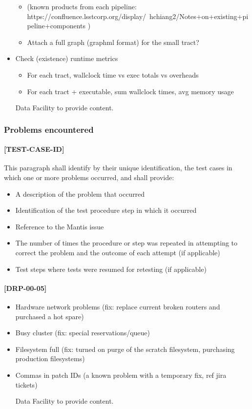 \documentclass[DM,lsstdraft,STR,toc]{lsstdoc}
\begin{document}
\begin{itemize}
\begin{itemize}
    \item (known products from each pipeline: https://confluence.lsstcorp.org/display/~hchiang2/Notes+on+existing+pipeline+components )
    \item Attach a full graph (graphml format) for the small tract?
  \end{itemize}
  \item Check (existence) runtime metrics
  \begin{itemize}
    \item For each tract, wallclock time vs exec totals vs overheads
    \item For each tract + executable, sum wallclock times, avg memory usage
  \end{itemize}
\begin{note}
Data Facility to provide content.
\end{note}
\end{itemize}

\subsubsection{Problems encountered}
\paragraph{[TEST-CASE-ID]}
This paragraph shall identify by their unique identification, the test cases in which one or more problems occurred, and shall provide:
\begin{itemize}
\item A description of the problem that occurred
\item Identification of the test procedure step in which it occurred
\item Reference to the Mantis issue
\item The number of times the procedure or step was repeated in attempting to correct the problem and the outcome of each attempt (if applicable)
\item Test steps where tests were resumed for retesting (if applicable)
\end{itemize}

\paragraph{[DRP-00-05]}
\begin{itemize}
  \item Hardware network problems (fix: replace current broken routers and purchased a hot spare)
  \item Busy cluster (fix: special reservations/queue)
  \item Filesystem full (fix: turned on purge of the scratch filesystem, purchasing production filesystems)
  \item Commas in patch IDs (a known problem with a temporary fix, ref jira tickets)
\begin{note}
Data Facility to provide content.
\end{note}
\end{itemize}
\end{document}
